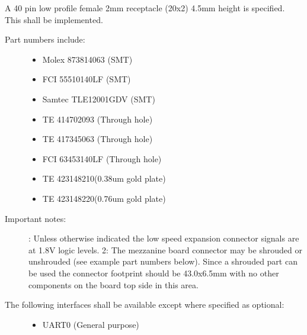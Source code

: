 \documentclass[a4paper,10pt,oneside,english]{sphinxmanual}
\begin{document}
\sphinxAtStartPar
{}

\sphinxAtStartPar
A 40 pin low profile female 2mm receptacle (20x2) 4.5mm height is specified. This shall be implemented.
\begin{description}
\item[{Part numbers include:}] \leavevmode\begin{itemize}
\item {} 
\sphinxAtStartPar
Molex 87381\sphinxhyphen{}4063           (SMT)

\item {} 
\sphinxAtStartPar
FCI 55510\sphinxhyphen{}140LF            (SMT)

\item {} 
\sphinxAtStartPar
Samtec TLE\sphinxhyphen{}120\sphinxhyphen{}01\sphinxhyphen{}G\sphinxhyphen{}DV     (SMT)

\item {} 
\sphinxAtStartPar
TE 4\sphinxhyphen{}1470209\sphinxhyphen{}3             (Through hole)

\item {} 
\sphinxAtStartPar
TE 4\sphinxhyphen{}1734506\sphinxhyphen{}3             (Through hole)

\item {} 
\sphinxAtStartPar
FCI 63453\sphinxhyphen{}140LF            (Through hole)

\item {} 
\sphinxAtStartPar
TE 4\sphinxhyphen{}2314821\sphinxhyphen{}0(0.38um gold plate)

\item {} 
\sphinxAtStartPar
TE 4\sphinxhyphen{}2314822\sphinxhyphen{}0(0.76um gold plate)

\end{itemize}

\item[{Important notes:}] \leavevmode
{}: Unless otherwise indicated the low speed expansion connector signals are at 1.8V logic levels.
2: The mezzanine board connector may be shrouded or unshrouded (see example part numbers below). Since a shrouded part can be used the connector footprint should be 43.0x6.5mm with no other components on the board top side in this area.

\item[{The following interfaces shall be available except where specified as optional:}] \leavevmode\begin{itemize}
\item {} 
\sphinxAtStartPar
UART0              (General purpose)


\end{itemize}
\end{description}
\end{document}
